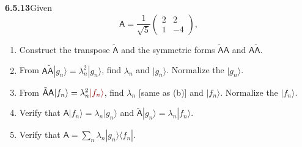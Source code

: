 \par\bigskip
\noindent\textbf{6.5.13}\quad Given
\[
\mathsf{A}=\frac{1}{\sqrt{5}}\begin{pmatrix}2&2\\1&-4\end{pmatrix},
\]
\begin{enumerate}
\item[(a)] Construct the transpose $\tilde{\mathsf{A}}$ and the symmetric
  forms $\tilde{\mathsf{A}}\mathsf{A}$ and $\mathsf{A}\tilde{\mathsf{A}}$.
\item[(b)] From $\mathsf{A}\tilde{\mathsf{A}}|g_{n}\rangle
  =\lambda_{n}^{2}|g_{n}\rangle$, find $\lambda_{n}$ and $|g_{n}\rangle$.
  Normalize the $|g_{n}\rangle$.
\item[(c)] From $\tilde{\mathsf{A}}\mathsf{A}|f_{n}\rangle
  =\lambda_{n}^{2}\erratum{|f_{n}\rangle}$, find $\lambda_{n}$ [same as (b)] and
  $|f_{n}\rangle$. Normalize the $|f_{n}\rangle$.
\item[(d)] Verify that $\mathsf{A}|f_{n}\rangle=\lambda_{n}|g_{n}\rangle$ and
  $\tilde{\mathsf{A}}|g_{n}\rangle=\lambda_{n}|f_{n}\rangle$.
\item[(e)] Verify that
  $\mathsf{A}=\sum_{n}\lambda_{n}|g_{n}\rangle\langle f_{n}|$.
\end{enumerate}
\solution
{}

